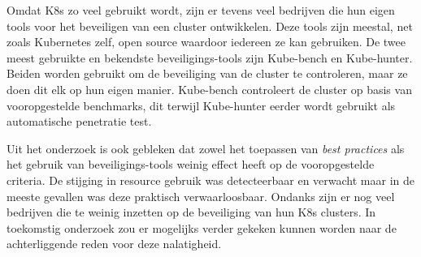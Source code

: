 Omdat K8s zo veel gebruikt wordt, zijn er tevens veel bedrijven die hun eigen tools voor het beveiligen van een cluster ontwikkelen. Deze tools zijn meestal, net zoals Kubernetes zelf, open source waardoor iedereen ze kan gebruiken. De twee meest gebruikte en bekendste beveiligings-tools zijn Kube-bench en Kube-hunter. Beiden worden gebruikt om de beveiliging van de cluster te controleren, maar ze doen dit elk op hun eigen manier. Kube-bench controleert de cluster op basis van vooropgestelde benchmarks, dit terwijl Kube-hunter eerder wordt gebruikt als automatische penetratie test.

Uit het onderzoek is ook gebleken dat zowel het toepassen van \textit{best practices} als het gebruik van beveiligings-tools weinig effect heeft op de vooropgestelde criteria. De stijging in resource gebruik was detecteerbaar en verwacht maar in de meeste gevallen was deze praktisch verwaarloosbaar. Ondanks zijn er nog veel bedrijven die te weinig inzetten op de beveiliging van hun K8s clusters. In toekomstig onderzoek zou er mogelijks verder gekeken kunnen worden naar de achterliggende reden voor deze nalatigheid.  